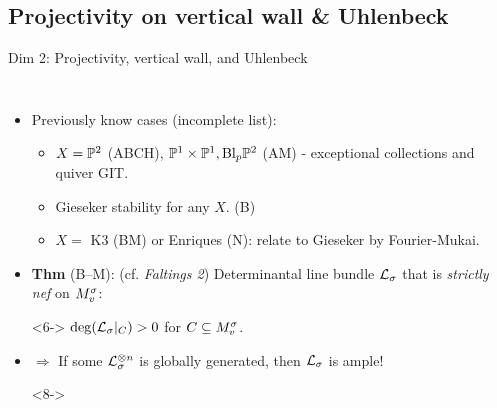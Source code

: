 \documentclass[8pt,handout]{beamer} %
\begin{document}
\subsection{{\color{purple} Projectivity on vertical wall \& Uhlenbeck}}
\begin{frame}[fragile]{Dim 2: Projectivity, vertical wall, and Uhlenbeck}
    \begin{columns}[t]
        \begin{itemize}
            \item<2-> Previously know cases (incomplete list):
            \begin{itemize}
                \item<3-> $X = \mathbb{P}^2$ {\footnotesize (ABCH)}, $\mathbb{P}^1 \times \mathbb{P}^1, \text{Bl}_p \mathbb{P}^2$ {\footnotesize (AM)} - exceptional collections and quiver GIT.
                \item<4-> Gieseker stability for any $X$. {\footnotesize (B)}
                \item<5-> $X = $ K3 {\footnotesize (BM)} or Enriques {\footnotesize (N)}: relate to Gieseker by Fourier-Mukai.
            \end{itemize}
        \item<6-> \textbf{Thm} (B--M): (cf. \textit{Faltings 2}) Determinantal line bundle $\mathcal{L}_\sigma$ that is \textit{strictly nef} on $M^\sigma_v$: %
        \item[]<6-> $\deg(\mathcal{L}_\sigma|_C) > 0$ for $C \subseteq M^\sigma_v$.
        \item<7-> $\Rightarrow$ If some $\mathcal{L}_\sigma^{\otimes n}$ is globally generated, then $\mathcal{L}_\sigma$ is ample!
        \item[]
        \item[]<8->
        \begin{center}
\end{center}
\end{itemize}
\end{columns}
\end{frame}
\end{document}

